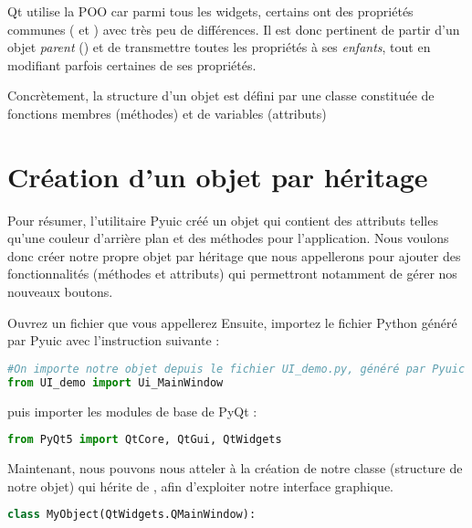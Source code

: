 

Qt utilise la POO car parmi tous les widgets, certains ont des propriétés communes ( et ) avec très peu de différences. Il est donc pertinent de partir d'un objet \textit{parent} () et de transmettre toutes les propriétés à ses \textit{enfants}, tout en modifiant parfois certaines de ses propriétés. \newline

Concrètement, la structure d'un objet est défini par une classe constituée de fonctions membres (méthodes) et de variables (attributs)

\section{Création d'un objet par héritage}

Pour résumer, l'utilitaire Pyuic créé un objet  qui contient des attributs telles qu'une couleur d'arrière plan et des méthodes pour l'application. \newline
Nous voulons donc créer notre propre objet par héritage que nous appellerons  pour ajouter des fonctionnalités (méthodes et attributs) qui permettront notamment de gérer nos nouveaux boutons. \newline

Ouvrez un fichier que vous appellerez 
Ensuite, importez le fichier Python généré par Pyuic avec l'instruction suivante :

\begin{lstlisting}[language=Python]
#On importe notre objet depuis le fichier UI_demo.py, généré par Pyuic
from UI_demo import Ui_MainWindow
\end{lstlisting}

puis importer les modules de base de PyQt :  
\begin{lstlisting}[language=Python]
from PyQt5 import QtCore, QtGui, QtWidgets
\end{lstlisting}

Maintenant, nous pouvons nous atteler à la création de notre classe  (structure de notre objet) qui hérite de , afin d'exploiter notre interface graphique.


\begin{lstlisting}[language=Python]
class MyObject(QtWidgets.QMainWindow):
\end{lstlisting}

